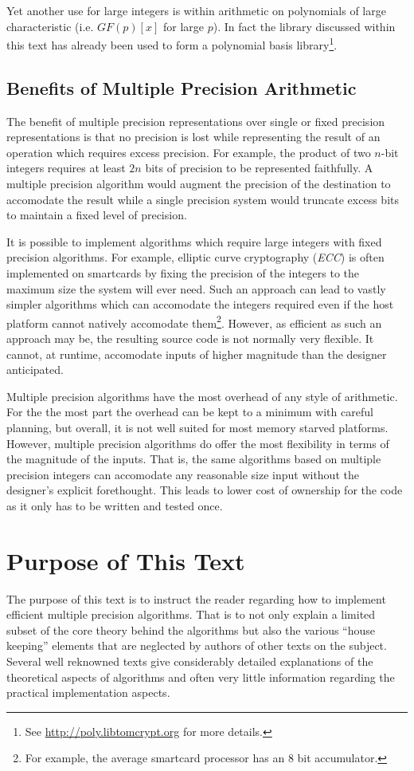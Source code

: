 \documentclass[b5paper]{book}
\begin{document}
Yet another use for large integers is within arithmetic on polynomials of large characteristic (i.e. $GF(p)[x]$ for large $p$).
In fact the library discussed within this text has already been used to form a polynomial basis library\footnote{See \url{http://poly.libtomcrypt.org} for more details.}.

\subsection{Benefits of Multiple Precision Arithmetic}
The benefit of multiple precision representations over single or fixed precision representations is that 
no precision is lost while representing the result of an operation which requires excess precision.  For example, 
the product of two $n$-bit integers requires at least $2n$ bits of precision to be represented faithfully.  A multiple 
precision algorithm would augment the precision of the destination to accomodate the result while a single precision system 
would truncate excess bits to maintain a fixed level of precision.

It is possible to implement algorithms which require large integers with fixed precision algorithms.  For example, elliptic
curve cryptography (\textit{ECC}) is often implemented on smartcards by fixing the precision of the integers to the maximum 
size the system will ever need.  Such an approach can lead to vastly simpler algorithms which can accomodate the 
integers required even if the host platform cannot natively accomodate them\footnote{For example, the average smartcard 
processor has an 8 bit accumulator.}.  However, as efficient as such an approach may be, the resulting source code is not
normally very flexible.  It cannot, at runtime, accomodate inputs of higher magnitude than the designer anticipated.

Multiple precision algorithms have the most overhead of any style of arithmetic.  For the the most part the 
overhead can be kept to a minimum with careful planning, but overall, it is not well suited for most memory starved
platforms.  However, multiple precision algorithms do offer the most flexibility in terms of the magnitude of the 
inputs.  That is, the same algorithms based on multiple precision integers can accomodate any reasonable size input 
without the designer's explicit forethought.  This leads to lower cost of ownership for the code as it only has to 
be written and tested once.

\section{Purpose of This Text}
The purpose of this text is to instruct the reader regarding how to implement efficient multiple precision algorithms.  
That is to not only explain a limited subset of the core theory behind the algorithms but also the various ``house keeping'' 
elements that are neglected by authors of other texts on the subject.  Several well reknowned texts \cite{TAOCPV2,HAC} 
give considerably detailed explanations of the theoretical aspects of algorithms and often very little information 
regarding the practical implementation aspects.  
\end{document}
